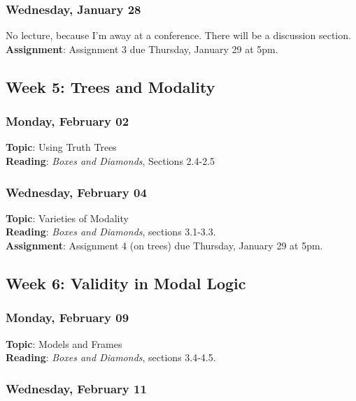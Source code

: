 \documentclass[
  letterpaper,
  DIV=11,
  numbers=noendperiod]{scrartcl}
\begin{document}
\subsubsection{Wednesday, January 28}\label{wednesday-january-28}

No lecture, because I'm away at a conference. There will be a discussion
section.\\
\textbf{Assignment}: Assignment 3 due Thursday, January 29 at 5pm.

\subsection{Week 5: Trees and Modality}\label{week-5-trees-and-modality}

\subsubsection{Monday, February 02}\label{monday-february-02}

\textbf{Topic}: Using Truth Trees\\
\textbf{Reading}: \emph{Boxes and Diamonds}, Sections 2.4-2.5

\subsubsection{Wednesday, February 04}\label{wednesday-february-04}

\textbf{Topic}: Varieties of Modality\\
\textbf{Reading}: \emph{Boxes and Diamonds}, sections 3.1-3.3.\\
\textbf{Assignment}: Assignment 4 (on trees) due Thursday, January 29 at
5pm.

\subsection{Week 6: Validity in Modal
Logic}\label{week-6-validity-in-modal-logic}

\subsubsection{Monday, February 09}\label{monday-february-09}

\textbf{Topic}: Models and Frames\\
\textbf{Reading}: \emph{Boxes and Diamonds}, sections 3.4-4.5.

\subsubsection{Wednesday, February 11}\label{wednesday-february-11}
\end{document}
